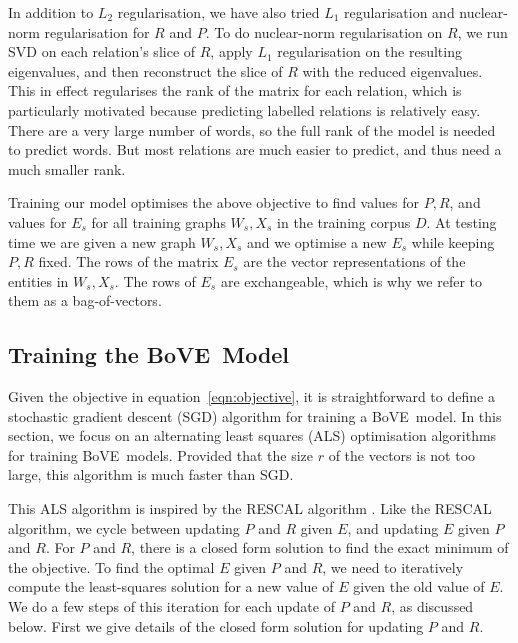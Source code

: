 \documentclass[11pt,a4paper]{article}
\newcommand{\bove}{Bo{\nolinebreak\hspace{-0.25ex}}VE}
\begin{document}
In addition to $L_2$ regularisation, we have also tried $L_1$ regularisation and
nuclear-norm regularisation for $R$ and $P$.  To do nuclear-norm
regularisation on $R$, we run SVD on each relation's slice of $R$, apply $L_1$
regularisation on the resulting eigenvalues, and then reconstruct the slice of
$R$ with the reduced eigenvalues.  This in effect regularises the rank of the
matrix for each relation, which is particularly motivated because predicting
labelled relations is relatively easy.  There are a very large number of
words, so the full rank of the model is needed to predict words.  But most
relations are much easier to predict, and thus need a much smaller rank.

Training our model optimises the above objective to find values for $P,R$, and
values for $E_s$ for all training graphs $W_s,X_s$ in the training corpus $D$.  At
testing time we are given a new graph $W_s,X_s$ and we optimise a new $E_s$
while keeping $P,R$ fixed.  The rows of the matrix $E_s$ are the vector
representations of the entities in $W_s,X_s$.  The rows of $E_s$ are
exchangeable, which is why we refer to them as a bag-of-vectors.



\subsection{Training the \bove\ Model}
\label{sec:training}

Given the objective in equation~\ref{eqn:objective}, it is straightforward to
define a stochastic gradient descent (SGD) algorithm for training a
\bove\ model.  In this section, we focus on an alternating least squares (ALS)
optimisation algorithms for training \bove\ models.  Provided that the size
$r$ of the vectors is not too large, this algorithm is much faster than SGD.

This ALS algorithm is inspired by the RESCAL algorithm
\cite{nickel2011,nickel2012}.  Like the RESCAL algorithm, we cycle between
updating $P$ and $R$ given $E$, and updating $E$ given $P$ and $R$.  For $P$
and $R$, there is a closed form solution to find the exact minimum of the
objective.  To find the optimal $E$ given $P$ and $R$, we need to iteratively
compute the least-squares solution for a new value of $E$ given the old value
of $E$.  We do a few steps of this iteration for each update of $P$ and $R$,
as discussed below.  First we give details of the closed form solution for
updating $P$ and $R$.
\end{document}
